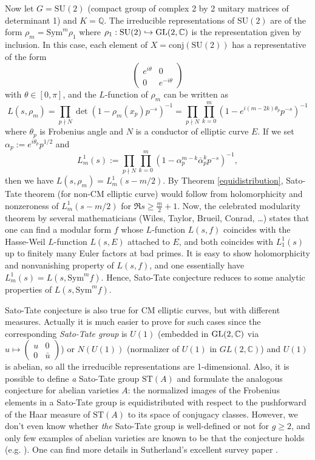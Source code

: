 Now let $G = \mathrm{SU}(2)$ (compact group of complex 2 by 2 unitary matrices of determinant 1)
and $K = \mathbb{Q}$. The irreducible representations of $\mathrm{SU}(2)$ are of the form $\rho_{m} = \mathrm{Sym}^{m}\rho_{1}$
where $\rho_{1}: \mathrm{SU}(2) \hookrightarrow \operatorname{\mathrm{GL}}(2, \mathbb{C})$ is the representation given by inclusion.
In this case, each element of $X = \mathrm{conj}(\mathrm{SU}(2))$ has a representative of the form
$$
\begin{pmatrix}
    e^{i\theta} & 0 \\ 0 & e^{-i\theta}
\end{pmatrix}
$$
with $\theta \in [0, \pi]$, and the $L$-function of $\rho_{m}$ can be written as
$$
L(s, \rho_{m}) = \prod_{p\nmid N} \det(1 - \rho_{m}(x_{p})p^{-s})^{-1} = \prod_{p\nmid N}\prod_{k=0}^{m} (1 - e^{i(m - 2k)\theta_{p}}p^{-s})^{-1}
$$
where $\theta_{p}$ is Frobenius angle and $N$ is a conductor of elliptic curve $E$.
If we set $\alpha_{p} := e^{i\theta_{p}}p^{1/2}$ and
$$
L_{m}^{1}(s):= \prod_{p\nmid N}\prod_{k=0}^{m} (1 - \alpha_{p}^{m-k}\bar{\alpha}_{p}^{k}p^{-s})^{-1},
$$
then we have $L(s, \rho_{m}) = L_{m}^{1}(s - m/2)$.
By Theorem \ref{equidistribution}, Sato-Tate theorem (for non-CM elliptic curve) would follow from
holomorphicity and nonzeroness of $L_{m}^{1}(s - m/2)$ for $\Re s \geq \frac{m}{2} + 1$.
Now, the celebrated modularity theorem by several mathematicians (Wiles, Taylor, Brueil, Conrad, \dots)
states that one can find a modular form $f$ whose $L$-function $L(s, f)$ coincides with
the Hasse-Weil $L$-function $L(s, E)$ attached to $E$, and both coincides with $L_{1}^{1}(s)$ up to
finitely many Euler factors at bad primes.
It is easy to show holomorphicity and nonvanishing property of $L(s, f)$, and
one essentially have $L_{m}^{1}(s) = L(s, \mathrm{Sym}^{m}f)$.
Hence, Sato-Tate conjecture reduces to some analytic properties of $L(s, \mathrm{Sym}^{m}f)$.

Sato-Tate conjecture is also true for CM elliptic curves, but with different measures.
Actually it is much easier to prove for such cases
since the corresponding \emph{Sato-Tate group} is $U(1)$ (embedded in $\operatorname{\mathrm{GL}}(2, \mathbb{C})$ via
$u\mapsto \left(\begin{smallmatrix}
    u & 0 \\ 0 & \bar{u}
\end{smallmatrix}\right)$) or $N(U(1))$ (normalizer of $U(1)$ in $GL(2, \mathbb{C})$) and $U(1)$ is abelian,
so all the irreducible representations are 1-dimensional.
Also, it is possible to define \emph{a} Sato-Tate group $\mathrm{ST}(A)$ and formulate the analogous conjecture
for abelian varieties $A$: the normalized images of the Frobenius elements in a Sato-Tate group
is equidistributed with respect to the pushforward of the Haar measure of $\mathrm{ST}(A)$ to its
space of conjugacy classes.
However, we don't even know whether \emph{the} Sato-Tate group is well-defined or not for $g\geq 2$, and only 
few examples of abelian varieties are known to be that the conjecture holds (e.g. \cite{fite2014sato}).
One can find more details in Sutherland's excellent survey paper \cite{sutherland2013sato}.